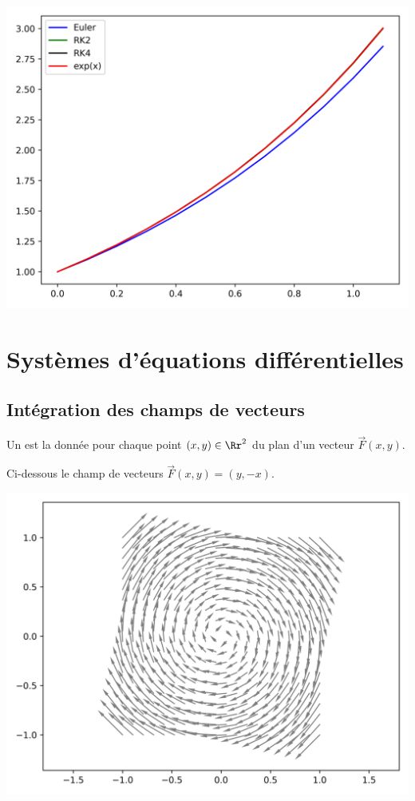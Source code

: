 \documentclass[11pt,class=report,crop=false]{standalone}
\begin{document}
\begin{center}
  \includegraphics[scale=\myscale,scale=0.7]{figures/equadiff-euler-05}
\end{center}


\section{Systèmes d'équations différentielles}

\subsection{Intégration des champs de vecteurs}

Un  est la donnée pour chaque point $(x,y) \in \Rr^2$ du plan d'un vecteur $\vec F (x,y)$.

Ci-dessous le champ de vecteurs $\vec F (x,y) = (y, -x)$.
\begin{center}
  \includegraphics[scale=\myscale, scale=0.7]{figures/equadiff-sys-01}
\end{center}
\end{document}
